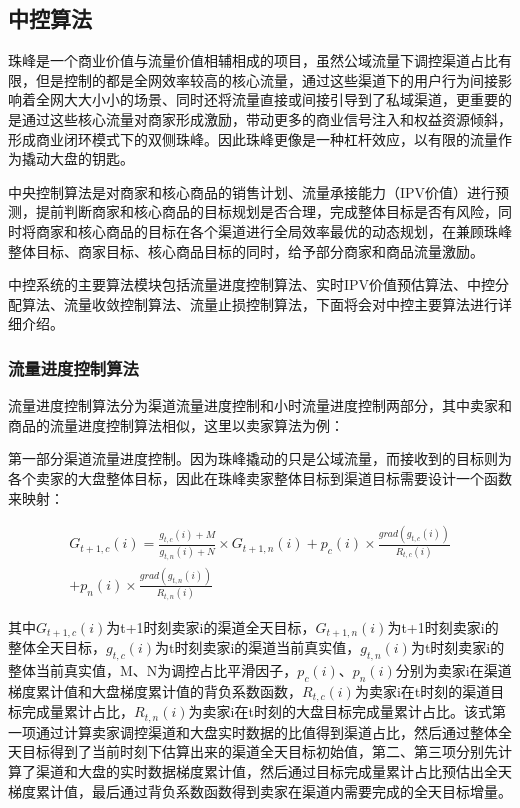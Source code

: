 \subsection{中控算法}
珠峰是一个商业价值与流量价值相辅相成的项目，虽然公域流量下调控渠道占比有限，但是控制的都是全网效率较高的核心流量，通过这些渠道下的用户行为间接影响着全网大大小小的场景、同时还将流量直接或间接引导到了私域渠道，更重要的是通过这些核心流量对商家形成激励，带动更多的商业信号注入和权益资源倾斜，形成商业闭环模式下的双侧珠峰。因此珠峰更像是一种杠杆效应，以有限的流量作为撬动大盘的钥匙。

中央控制算法是对商家和核心商品的销售计划、流量承接能力（IPV价值）进行预测，提前判断商家和核心商品的目标规划是否合理，完成整体目标是否有风险，同时将商家和核心商品的目标在各个渠道进行全局效率最优的动态规划，在兼顾珠峰整体目标、商家目标、核心商品目标的同时，给予部分商家和商品流量激励。

中控系统的主要算法模块包括流量进度控制算法、实时IPV价值预估算法、中控分配算法、流量收敛控制算法、流量止损控制算法，下面将会对中控主要算法进行详细介绍。
\subsubsection{流量进度控制算法}
流量进度控制算法分为渠道流量进度控制和小时流量进度控制两部分，其中卖家和商品的流量进度控制算法相似，这里以卖家算法为例：

第一部分渠道流量进度控制。因为珠峰撬动的只是公域流量，而接收到的目标则为各个卖家的大盘整体目标，因此在珠峰卖家整体目标到渠道目标需要设计一个函数来映射：

\begin{align}
G_{t+1,c}(i)=\frac{g_{t,c}(i) + M}{g_{t,n}(i) + N}\times G_{t+1,n}(i) + p_c(i)\times \frac{grad(g_{t,c}(i))}{R_{t,c}(i)} \\
+ p_n(i) \times \frac{grad(g_{t,n}(i))}{R_{t,n}(i)}
\end{align}

其中$G_{t+1,c}(i)$为t+1时刻卖家i的渠道全天目标，$G_{t+1,n}(i)$为t+1时刻卖家i的整体全天目标，$g_{t,c}(i)$为t时刻卖家i的渠道当前真实值，$g_{t,n}(i)$为t时刻卖家i的整体当前真实值，M、N为调控占比平滑因子，$p_c(i)$、$p_n(i)$分别为卖家i在渠道梯度累计值和大盘梯度累计值的背负系数函数，$R_{t,c}(i)$为卖家i在t时刻的渠道目标完成量累计占比，$R_{t,n}(i)$为卖家i在t时刻的大盘目标完成量累计占比。该式第一项通过计算卖家调控渠道和大盘实时数据的比值得到渠道占比，然后通过整体全天目标得到了当前时刻下估算出来的渠道全天目标初始值，第二、第三项分别先计算了渠道和大盘的实时数据梯度累计值，然后通过目标完成量累计占比预估出全天梯度累计值，最后通过背负系数函数得到卖家在渠道内需要完成的全天目标增量。

